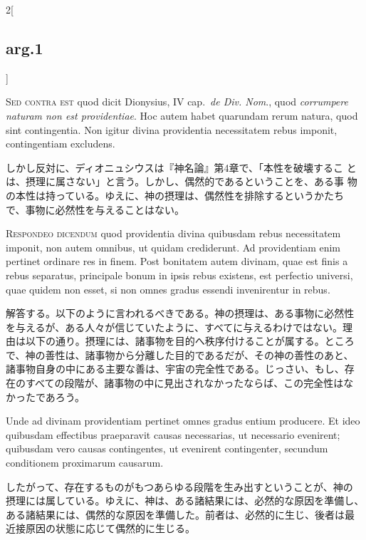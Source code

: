 \documentclass[paper=a4paper,fontsize=10pt,jafontsize=9pt,titlepage]{jlreq}
\begin{document}
\begin{paracol}{2}[\subsection{arg.1}]
\switchcolumn*[\subsection{s.c.}]

{\scshape Sed contra est} quod dicit Dionysius, IV
cap.~{\itshape de Div. Nom}., quod {\itshape corrumpere naturam non est providentiae}. Hoc
autem habet quarundam rerum natura, quod sint contingentia. Non igitur
divina providentia necessitatem rebus imponit, contingentiam excludens.

\switchcolumn

しかし反対に、ディオニュシウスは『神名論』第4章で、「本性を破壊するこ
とは、摂理に属さない」と言う。しかし、偶然的であるということを、ある事
物の本性は持っている。ゆえに、神の摂理は、偶然性を排除するというかたち
で、事物に必然性を与えることはない。


{\scshape Respondeo dicendum} quod providentia divina
quibusdam rebus necessitatem imponit, non autem omnibus, ut quidam
crediderunt. Ad providentiam enim pertinet ordinare res in finem. Post
bonitatem autem divinam, quae est finis a rebus separatus, principale
bonum in ipsis rebus existens, est perfectio universi, quae quidem non
esset, si non omnes gradus essendi invenirentur in rebus.

\switchcolumn

解答する。以下のように言われるべきである。神の摂理は、ある事物に必然性
を与えるが、ある人々が信じていたように、すべてに与えるわけではない。理
由は以下の通り。摂理には、諸事物を目的へ秩序付けることが属する。ところ
で、神の善性は、諸事物から分離した目的であるだが、その神の善性のあと、
諸事物自身の中にある主要な善は、宇宙の完全性である。じっさい、もし、存
在のすべての段階が、諸事物の中に見出されなかったならば、この完全性はな
かったであろう。

\switchcolumn*

Unde ad
divinam providentiam pertinet omnes gradus entium producere. Et ideo
quibusdam effectibus praeparavit causas necessarias, ut necessario
evenirent; quibusdam vero causas contingentes, ut evenirent
contingenter, secundum conditionem proximarum causarum.

\switchcolumn

したがって、存在するものがもつあらゆる段階を生み出すということが、神の
摂理には属している。ゆえに、神は、ある諸結果には、必然的な原因を準備し、
ある諸結果には、偶然的な原因を準備した。前者は、必然的に生じ、後者は最
近接原因の状態に応じて偶然的に生じる。


\end{paracol}
\end{document}
